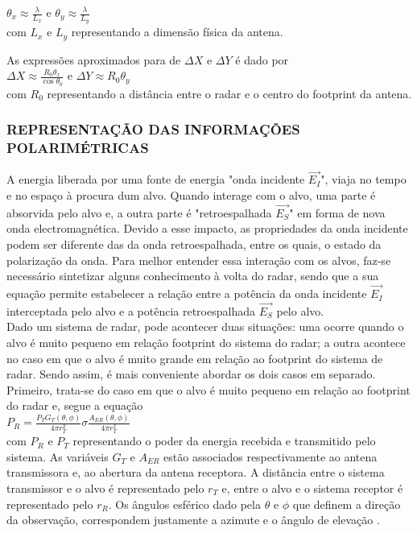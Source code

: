 \documentclass[a4paper,12pt]{article}
\begin{document}
$\theta_{x}\approx\frac{\lambda}{L_{x}}$ e $\theta_{y}\approx\frac{\lambda}{L_{y}}$ \\

com $L_{x}$ e $L_{y}$ representando a dimensão física da antena.

As expressões aproximados para de $\Delta X$ e $\Delta Y$ é dado por\\

$\Delta X\approx \frac{R_{0}\theta_{x}}{\cos{\theta_{0}}}$ e $\Delta Y\approx R_{0}\theta_{y}$\\

com $R_{0}$ representando a distância entre o radar e o centro do footprint da antena.\\


\subsubsection{REPRESENTAÇÃO DAS INFORMAÇÕES POLARIMÉTRICAS}
\label{subsec:rep}

A energia liberada por uma fonte de energia "onda incidente $\vec{E_{I}}$", viaja no tempo e no espaço à procura dum alvo. Quando interage com o alvo, uma parte é absorvida pelo alvo e, a outra parte é "retroespalhada $\vec{E_{S}}$" em forma de nova onda electromagnética. Devido a esse impacto, as propriedades da onda incidente podem ser diferente das da onda retroespalhada, entre os quais, o estado da polarização da onda. Para melhor entender essa interação com os alvos, faz-se necessário sintetizar alguns conhecimento à volta do radar, sendo que a sua equação permite estabelecer a relação entre a potência da onda incidente $\vec{E_{I}}$ interceptada pelo alvo e a potência retroespalhada $\vec{E_{S}}$ pelo alvo.\\

Dado um sistema de radar, pode acontecer duas situações: uma ocorre quando o alvo é muito pequeno em relação footprint do sistema do radar; a outra acontece no caso em que o alvo é muito grande em relação ao footprint do sistema de radar. Sendo assim, é mais conveniente abordar os dois casos em separado. Primeiro, trata-se do caso em que o alvo é muito pequeno em relação ao footprint do radar e, segue a equação\\

$P_{R}=\frac{P_{T}G_{T}(\theta, \phi)}{4\pi r^2_{T}}\sigma\frac{A_{ER}(\theta, \phi)}{4\pi r^2_{T}}$\\

com $P_{R}$ e $P_{T}$ representando o poder da energia recebida e transmitido pelo sistema. As variáveis $G_{T}$ e $A_{ER}$ estão associados respectivamente ao antena transmissora e, ao abertura da antena receptora. A distância entre o sistema transmissor e o alvo é representado pelo $r_{T}$ e, entre o alvo e o sistema receptor é representado pelo $r_{R}$. Os ângulos esférico dado pela $\theta$ e $\phi$ que definem a direção da observação, correspondem justamente a azimute e o ângulo de elevação \cite{jong:2009}.\\
\end{document}
